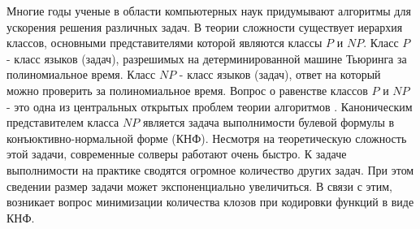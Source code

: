 
Многие годы ученые в области компьютерных наук придумывают алгоритмы для ускорения решения различных задач. В теории сложности существует иерархия классов, основными представителями которой являются классы $P$ и $NP$. Класс $P$ - класс языков (задач), разрешимых на детерминированной машине Тьюринга за полиномиальное время. Класс $NP$ - класс языков (задач), ответ на который можно проверить за полиномиальное время. Вопрос о равенстве классов $P$ и $NP$ - это одна из центральных открытых проблем теории алгоритмов \cite{?} . Каноническим представителем класса $NP$ является задача выполнимости булевой формулы в конъюктивно-нормальной форме (КНФ). Несмотря на теоретическую сложность этой задачи, современные солверы работают очень быстро. К задаче выполнимости на практике сводятся огромное количество других задач. При этом сведении размер задачи может экспоненциально увеличиться. В связи с этим, возникает вопрос минимизации количества клозов при кодировки функций в виде КНФ.